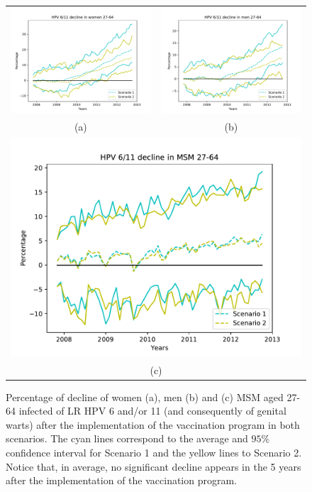 \begin{figure}[!]
	\centering
	\begin{tabular}{cc}
		\includegraphics[width=0.5\linewidth]{IMGs/3.-Australia/decline_27_64_verr_muj.pdf}	& 
		\includegraphics[width=0.5\linewidth]{IMGs/3.-Australia/decline_27_64_verr_hom.pdf}  \\ 
		(a)	& (b) \\ 
		\multicolumn{2}{c}{ \includegraphics[width=0.5\linewidth]{IMGs/3.-Australia/decline_27_64_verr_MSM.pdf} } \\ 
		\multicolumn{2}{c}{(c)} \\ 
	\end{tabular} 
	\caption{Percentage of decline of women (a), men (b) and (c) MSM aged 27-64 infected of LR HPV 6 and/or 11 (and consequently of genital warts) after the implementation of the vaccination program in both scenarios. The cyan lines correspond to the average and $95\%$ confidence interval for Scenario 1 and the yellow lines to Scenario 2. Notice that, in average, no significant decline appears in the 5 years after the implementation of the vaccination program.}
\label{fig:decline_AUS_6_11_27_64}
\end{figure}

